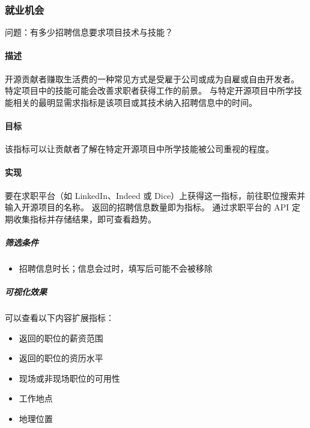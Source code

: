 \hypertarget{ux5c31ux4e1aux673aux4f1a}{%
\subsubsection{就业机会}\label{ux5c31ux4e1aux673aux4f1a}}

问题：有多少招聘信息要求项目技术与技能？

\hypertarget{ux63cfux8ff0}{%
\paragraph{描述}\label{ux63cfux8ff0}}

开源贡献者赚取生活费的一种常见方式是受雇于公司或成为自雇或自由开发者。
特定项目中的技能可能会改善求职者获得工作的前景。
与特定开源项目中所学技能相关的最明显需求指标是该项目或其技术纳入招聘信息中的时间。

\hypertarget{ux76eeux6807}{%
\paragraph{目标}\label{ux76eeux6807}}

该指标可以让贡献者了解在特定开源项目中所学技能被公司重视的程度。

\hypertarget{ux5b9eux73b0}{%
\paragraph{实现}\label{ux5b9eux73b0}}

要在求职平台（如 LinkedIn、Indeed 或
Dice）上获得这一指标，前往职位搜索并输入开源项目的名称。
返回的招聘信息数量即为指标。 通过求职平台的 API
定期收集指标并存储结果，即可查看趋势。

\hypertarget{ux7b5bux9009ux6761ux4ef6}{%
\subparagraph{筛选条件}\label{ux7b5bux9009ux6761ux4ef6}}

\begin{itemize}
\tightlist
\item
  招聘信息时长；信息会过时，填写后可能不会被移除
\end{itemize}

\hypertarget{ux53efux89c6ux5316ux6548ux679c}{%
\subparagraph{可视化效果}\label{ux53efux89c6ux5316ux6548ux679c}}

可以查看以下内容扩展指标：

\begin{itemize}
\tightlist
\item
  返回的职位的薪资范围
\item
  返回的职位的资历水平
\item
  现场或非现场职位的可用性
\item
  工作地点
\item
  地理位置
\end{itemize}


